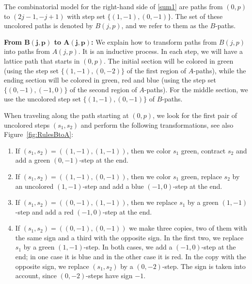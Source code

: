 \documentclass[12pt]{amsart}
\theoremstyle{definition}
\numberwithin{equation}{section}
\begin{document}
The combinatorial model for the right-hand side of \eqref{sum1} are paths from $(0,p)$ to $(2j-1,-j+1)$ with step set 
$\{(1,-1),(0,-1)\}$. 
The set of these uncolored paths is denoted by $B(j,p)$, and we refer to them as the $B$-paths.

{\bf From $\boldsymbol{B(j,p)}$ to $\boldsymbol{A(j,p)}$:} We explain how to transform paths from $B(j,p)$ into paths from $A(j,p)$. It is an inductive process. In each step, we will have a lattice path that starts in $(0,p)$. The initial section will be colored in green (using the step set $\{(1,-1),(0,-2)\}$ of the first region of $A$-paths), while the ending section will be colored in green, red and blue (using the step set $\{(0,-1),(-1,0)\}$ of the second region of $A$-paths). For the middle section, we use the uncolored step set $\{(1,-1),(0,-1)\}$ of $B$-paths.  

When traveling along the path starting at $(0,p)$, we look for the first pair of uncolored steps $(s_1,s_2)$ and perform the following transformations, see also Figure~\ref{fig:RulesBtoA}:

\begin{enumerate}
	\item If $(s_1,s_2)=((1,-1),(1,-1))$, then we color $s_1$ green, contract $s_2$ and add a green $(0,-1)$-step at the end. \label{list:BAfirst}
	\item If $(s_1,s_2)=((1,-1),(0,-1))$, then we color $s_1$ green, replace $s_2$ by an uncolored $(1,-1)$-step and add a blue $(-1,0)$-step at the end. \label{list:BAsecond}
	\item If $(s_1,s_2)=((0,-1),(1,-1))$, then we replace $s_1$ by a green $(1,-1)$-step and add a red $(-1,0)$-step at the end. \label{list:BAthird}
	\item If $(s_1,s_2)=((0,-1),(0,-1))$ we make three copies, two of them with the same sign and a third with the opposite sign. In the first two, we replace $s_1$ by a green $(1,-1)$-step. In both cases, we add a $(-1,0)$-step at the end; in one case it is blue and in the other case it is red. In the copy with the opposite sign, we replace $(s_1,s_2)$ by a $(0,-2)$-step. The sign is taken into account, since $(0,-2)$-steps have sign $-1$. \label{list:BAfourth}
\end{enumerate} 
\end{document}
